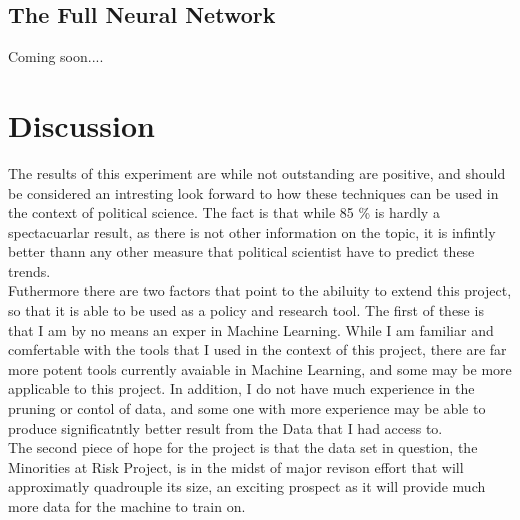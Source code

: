 \documentclass[12pt]{article}
\begin{document}
\subsection{The Full Neural Network }
Coming soon....

\section{Discussion}
	The results of this experiment are while not outstanding are positive, and should be considered an intresting look forward to how these techniques can be used in the context of political science. The fact is that while {85 \%} is hardly a spectacuarlar result, as there is not other information on the topic, it is infintly better thann any other measure that political scientist have to predict these trends.  \\

	Futhermore there are two factors that point to the abiluity to extend this project, so that it is able to be used as a policy and research tool. The first of these is that I am by no means an exper in Machine Learning. While I am familiar and comfertable with the tools that I used in the context of this project, there are far more potent tools currently avaiable in Machine Learning, and some may be more applicable to this project. In addition, I do not have much experience in the pruning or contol of data, and some one with more experience may be able to produce significatntly better result from the Data that I had access to. \\

	The second piece of hope for the project is that the data set in question, the Minorities at Risk Project, is in the midst of  major revison effort that will approximatly quadrouple its size, an exciting prospect as it will provide much more data for the machine to train on. 
\end{document}
